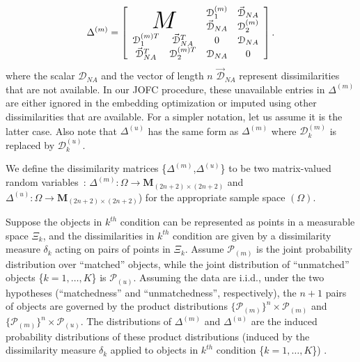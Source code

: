 \documentclass[12pt]{article} %
\newenvironment{remark}[1][Remark]{\begin{trivlist}
\item[\hskip \labelsep {\bfseries #1}]}{\end{trivlist}}
\begin{document}
 \begin{equation}
\Delta^{(m)}=  \left[ \begin{array}{cccc}
          \multicolumn{2}{c}{\multirow{2}{*}{\Huge{$M$}}} &  \mathcal{D}_1^{(m)} &\vec{\mathcal{D}}_{NA}\\
        & &  \vec{\mathcal{D}}_{NA}   & \mathcal{D}_2^{(m)} \\
				\mathcal{D}_1^{(m)T} & \vec{\mathcal{D}}_{NA}^T  &  0 & \mathcal{D}_{NA} \\
         \vec{\mathcal{D}}_{NA}^T & \mathcal{D}_2^{(m)T} & \mathcal{D}_{NA} &0\\
     \end{array}  \right].     \label{aug_omnibus} 
\end{equation}  where
the scalar $\mathcal{D}_{NA}$ and   the  vector of length $n$ $\vec{\mathcal{D}}_{NA}$   represent dissimilarities that are not available. 
In our JOFC procedure, these unavailable entries in $\Delta^{(m)}$ are either  ignored in the embedding optimization or imputed using other dissimilarities that are available. For a simpler  notation, let us assume it is the latter case. Also note that $\Delta^{(u)}$  has the same form as $\Delta^{(m)}$ where $\mathcal{D}_k^{(m)}$ is replaced by $\mathcal{D}_k^{(u)}$.

We define the dissimilarity matrices \{$\Delta^{(m)}$,$\Delta^{(u)}$\} to be  two matrix-valued random variables~: $\Delta^{(m)}:\Omega \rightarrow \mathbf{M}_{(2n+2)\times (2n+2)} $ and  $\Delta^{(u)}:\Omega \rightarrow \mathbf{M}_{(2n+2)\times (2n+2)} $) for the appropriate sample  space $(\Omega)$.
\begin{remark}
Suppose the objects in $k^{th}$  condition  can be represented as points in a measurable space $\Xi_k$, and the dissimilarities in $k^{th}$ condition are given by  a dissimilarity measure $\delta_k$ acting on pairs of points in $\Xi_k$. Assume $\mathcal{P}_{(m)}$ is the joint probability distribution over ``matched'' objects, while the joint distribution of ``unmatched'' objects \{$k=1,\ldots,K$\}  is $\mathcal{P}_{(u)}$. Assuming the data are i.i.d., under the two hypotheses (``matchedness'' and ``unmatchedness'', respectively), the $n+1$ pairs of objects are governed  by the product distributions $\{\mathcal{P}_{(m)}\}^n \times \mathcal{P}_{(m)} $ and $\{\mathcal{P}_{(m)}\}^n \times \mathcal{P}_{(u)} $.  The distributions of $\Delta^{(m)}$ and $\Delta^{(u)}$ are the induced probability distributions of  these product distributions (induced by the  dissimilarity measure $\delta_k$ applied to  objects in $k^{th}$ condition \{$k=1,\ldots,K$\})  .
\end{remark}
\end{document}
